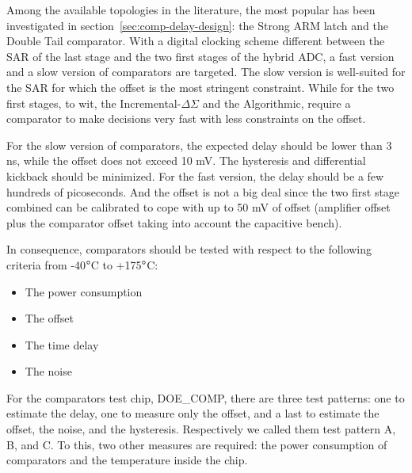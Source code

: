 Among the available topologies in the literature, the most popular has been investigated in section~\ref{sec:comp-delay-design}: the Strong ARM latch and the Double Tail comparator. With a digital clocking scheme different between the SAR of the last stage and the two first stages of the hybrid ADC, a fast version and a slow version of comparators are targeted. The slow version is well-suited for the SAR for which the offset is the most stringent constraint. While for the two first stages, to wit, the Incremental-\(\Delta \Sigma\) and the Algorithmic, require a comparator to make decisions very fast with less constraints on the offset.

For the slow version of comparators, the expected delay should be lower than 3 ns, while the offset does not exceed 10 mV. The hysteresis and differential kickback should be minimized. For the fast version, the delay should be a few hundreds of picoseconds. And the offset is not a big deal since the two first stage combined can be calibrated to cope with up to 50 mV of offset (amplifier offset plus the comparator offset taking into account the capacitive bench).

In consequence, comparators should be tested with respect to the following criteria from -40\(\degree\)C to +175\(\degree\)C\@:
\begin{itemize}
\item The power consumption
\item The offset
\item The time delay
\item The noise
\end{itemize}

For the comparators test chip, DOE\_COMP, there are three test patterns: one to estimate the delay, one to measure only the offset, and a last to estimate the offset, the noise, and the hysteresis. Respectively we called them test pattern A, B, and C. To this, two other measures are required: the power consumption of comparators and the temperature inside the chip.


